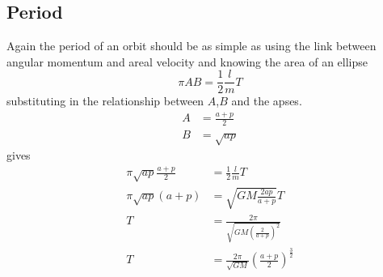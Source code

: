 \subsection{Period}
Again the period of an orbit should be as simple as using the link between angular momentum and areal velocity and knowing the area of an ellipse
\begin{equation}
\pi AB=\frac{1}{2}\frac{l}{m}T
\end{equation}
substituting in the relationship between $A$,$B$ and the apses.
\begin{subequations}
\begin{align}
A&=\frac{a+p}{2}\\
B&=\sqrt{ap}
\end{align}
\end{subequations}
gives
\begin{align}
\pi \sqrt{ap}\frac{a+p}{2}&=\frac{1}{2}\frac{l}{m}T \nonumber \\
\pi \sqrt{ap}(a+p)&=\sqrt{GM\frac{2ap}{a+p}}T \nonumber \\
T &= \frac{2\pi}{\sqrt{GM\left(\frac{2}{a+p}\right)^2}} \nonumber \\
T &=\frac{2\pi}{\sqrt{GM}}\left(\frac{a+p}{2}\right)^\frac{3}{2}
\end{align}

